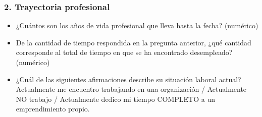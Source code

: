 \documentclass[12pt]{article}
\begin{document}
\subsubsection*{2. Trayectoria profesional}

\begin{itemize}[nosep]
    \item ¿Cuántos son los años de vida profesional que lleva hasta la
    fecha? (numérico)
    \item De la cantidad de tiempo respondida en la pregunta anterior,
    ¿qué cantidad corresponde al total de tiempo en que se ha encontrado
    desempleado? (numérico)
    \item ¿Cuál de las siguientes afirmaciones describe su situación
    laboral actual? Actualmente me encuentro trabajando en una
    organización / Actualmente NO trabajo / Actualmente dedico mi tiempo
    COMPLETO a un emprendimiento propio.
\end{itemize}
\end{document}
